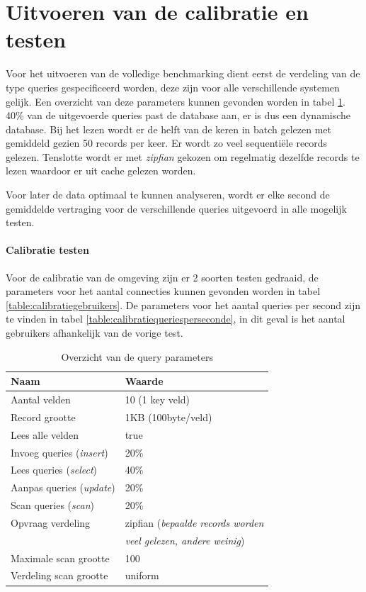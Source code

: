 \section{Uitvoeren van de calibratie en testen}
Voor het uitvoeren van de volledige benchmarking dient eerst de verdeling van de type queries gespecificeerd worden, deze zijn voor alle verschillende systemen gelijk. Een overzicht van deze parameters kunnen gevonden worden in tabel \ref{table:calibratiequeries}. 40\% van de uitgevoerde queries past de database aan, er is dus een dynamische database. Bij het lezen wordt er de helft van de keren in batch gelezen met gemiddeld gezien 50 records per keer. Er wordt zo veel sequentiële records gelezen. Tenslotte wordt er met \textit{zipfian} gekozen om regelmatig dezelfde records te lezen waardoor er uit cache gelezen worden. 

Voor later de data optimaal te kunnen analyseren, wordt er elke second de gemiddelde vertraging voor de verschillende queries uitgevoerd in alle mogelijk testen. 

\paragraph{Calibratie testen} Voor de calibratie van de omgeving zijn er 2 soorten testen gedraaid, de parameters voor het aantal connecties kunnen gevonden worden in tabel \ref{table:calibratiegebruikers}. De parameters voor het aantal queries per second zijn te vinden in tabel \ref{table:calibratiequeriesperseconde}, in dit geval is het aantal gebruikers afhankelijk van de vorige test. 

\begin{table}[htb!]
	\centering
	\begin{tabular}{l| l }
	\textbf{Naam} & \textbf{Waarde} \\
	\hline
	Aantal velden & 10 (1 key veld) \\
	Record grootte & 1KB (100byte/veld) \\
	Lees alle velden & true \\
	Invoeg queries (\textit{insert}) & 20\%\\
	Lees queries (\textit{select}) & 40\%\\
	Aanpas queries (\textit{update}) & 20\%\\
	Scan queries (\textit{scan}) & 20\%\\
	Opvraag verdeling & zipfian (\textit{bepaalde records worden} \\
	& \textit{veel gelezen, andere weinig}) \\
	Maximale scan grootte & 100 \\
	Verdeling scan grootte & uniform \\
	\end{tabular}
	\caption{Overzicht van de query parameters}
	\label{table:calibratiequeries}
\end{table}

